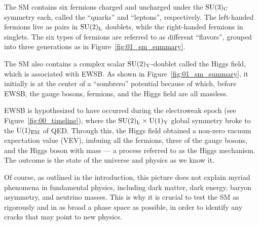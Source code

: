 The SM contains six fermions charged and uncharged under the $\SU[3]_\mathrm{C}$ symmetry each, called the ``quarks'' and ``leptons'', respectively.
The left-handed fermions live as pairs in $\SU[2]_\mathrm{L}$ doublets, while the right-handed fermions in singlets.
The six types of fermions are referred to as different ``flavors'', grouped into three generations as in Figure~\ref{fig:01_sm_summary}.

The SM also contains a complex scalar $\SU[2]_\mathrm{Y}$-doublet called the Higgs field, which is associated with EWSB.
As shown in Figure~\ref{fig:01_sm_summary}, it initially is at the center of a ``sombrero'' potential because of which, before EWSB, the gauge bosons, fermions, and the Higgs field are all massless.

EWSB is hypothesized to have occurred during the electroweak epoch (see Figure~\ref{fig:00_timeline}), where the $\SU[2]_\mathrm{L} \times \UU[1]_\mathrm{Y}$ global symmetry broke to the $\UU[1]_\mathrm{EM}$ of QED.
Through this, the Higgs field obtained a non-zero vacuum expectation value (VEV), imbuing all the fermions, three of the gauge bosons, and the Higgs boson with mass --- a process referred to as the Higgs mechanism.
The outcome is the state of the universe and physics as we know it.

Of course, as outlined in the introduction, this picture does not explain myriad phenomena in fundamental physics, including dark matter, dark energy, baryon asymmetry, and neutrino masses.
This is why it is crucial to test the SM as rigorously and in as broad a phase space as possible, in order to identify any cracks that may point to new physics.


